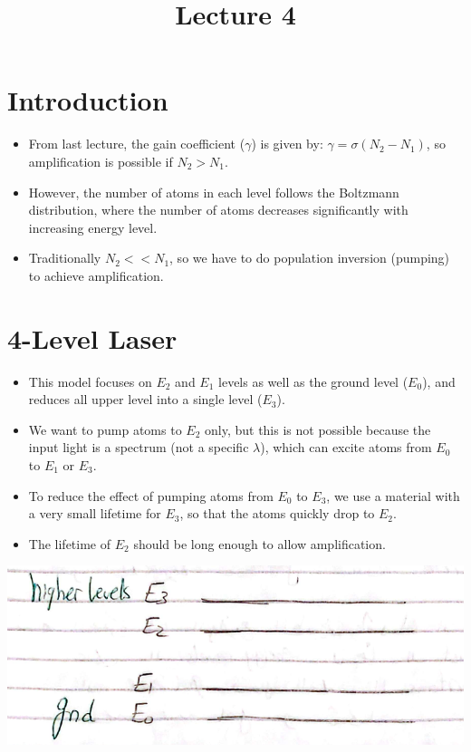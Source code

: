 \documentclass[11pt]{article}
\title{Lecture 4}
\author{}
\date{}
\begin{document}
\maketitle

\section{Introduction}
\begin{itemize}
    \item From last lecture, the gain coefficient ($\gamma$) is given by: $\gamma = \sigma (N_2-N_1)$, so amplification is possible if $N_2 > N_1$.
    \item However, the number of atoms in each level follows the Boltzmann distribution, where the number of atoms decreases significantly with increasing energy level.
    \item Traditionally $N_2 << N_1$, so we have to do population inversion (pumping) to achieve amplification.
\end{itemize}

\section{4-Level Laser}
\begin{itemize}
    \item This model focuses on $E_2$ and $E_1$ levels as well as the ground level ($E_0$), and reduces all upper level into a single level ($E_3$).
    \item We want to pump atoms to $E_2$ only, but this is not possible because the input light is a spectrum (not a specific $\lambda$), which can excite atoms from $E_0$ to $E_1$ or $E_3$.
    \item To reduce the effect of pumping atoms from $E_0$ to $E_3$, we use a material with a very small lifetime for $E_3$, so that the atoms quickly drop to $E_2$.
    \item The lifetime of $E_2$ should be long enough to allow amplification.
\end{itemize}
\begin{center}
    \includegraphics[scale=0.6]{1.png}
\end{center}
\end{document}
